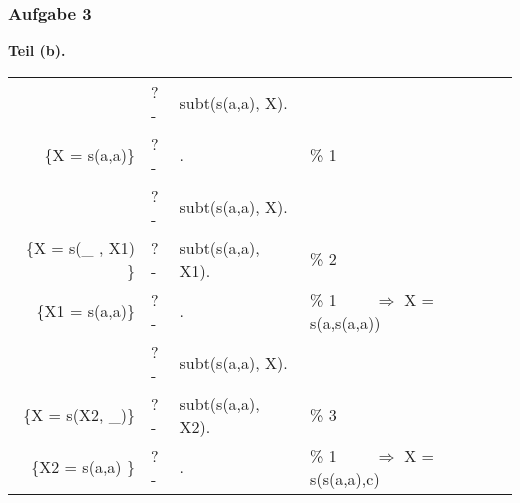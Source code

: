 \documentclass[aspectratio=1610,onlymath, ngerman]{beamer}
\renewcommand{\emph}[1]{\textbf{#1}}
\begin{document}
	\begin{frame} \frametitle{Aufgabe 3}
	\small
		
		\emph{Teil (b).}
		
		\begin{tabular}{>{\ttfamily}r l >{\ttfamily}l >{\ttfamily}l}
			& ?- & subt(s(a,a), X). \\
			\{X = s(a,a)\} &?- & . & \% 1 \\[9pt] %
			& ?- & subt(s(a,a), X). \\
			\{X = s(\_ , X1) \} & ?- & subt(s(a,a), X1). & \% 2 \\
			\{X1 = s(a,a)\} & ?- & . & \% 1 $\qquad \Rightarrow$ X = s(a,s(a,a))\\[9pt]
			& ?- & subt(s(a,a), X). \\
			\{X = s(X2, \_)\}& ?- & subt(s(a,a), X2). & \% 3 \\
			\{X2 = s(a,a) \} & ?- & . & \% 1 $\qquad \Rightarrow$ X = s(s(a,a),c)
		\end{tabular}
	\end{frame}
\end{document}
